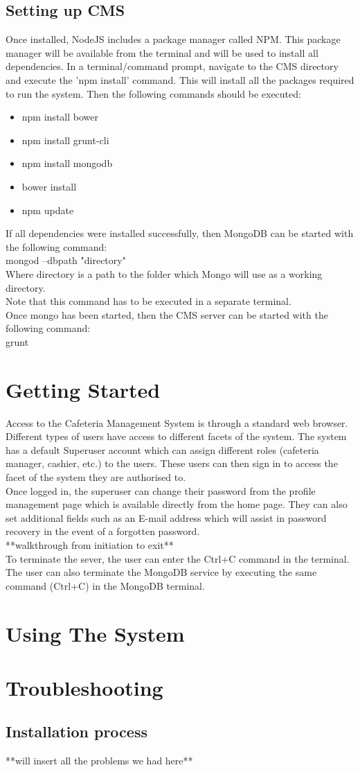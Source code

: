 \documentclass[12pt]{article}
\begin{document}
\subsection{Setting up CMS}
Once installed, NodeJS includes a package manager called NPM. This package manager will be available from the terminal and will be used to install all dependencies. In a terminal/command prompt, navigate to the CMS directory and execute the 'npm install' command. This will install all the packages required to run the system. Then the following commands should be executed:
\begin{itemize}
\item npm install bower
\item npm install grunt-cli
\item npm install mongodb
\item bower install
\item npm update
\end{itemize}

If all dependencies were installed successfully, then MongoDB can be started with the following command:\\
mongod --dbpath "directory"\\
Where directory is a path to the folder which Mongo will use as a working directory.\\
Note that this command has to be executed in a separate terminal.\\
Once mongo has been started, then the CMS server can be started with the following command:\\
grunt

\section{Getting Started}
Access to the Cafeteria Management System is through a standard web browser. Different types of users have access to different facets of the system. The system has a default Superuser account which can assign different roles (cafeteria manager, cashier, etc.) to the users. These users can then sign in to access the facet of the system they are authorised to.\\
Once logged in, the superuser can change their password from the profile management page which is available directly from the home page. They can also set additional fields such as an E-mail address which will assist in password recovery in the event of a forgotten password.\\
**walkthrough from initiation to exit**\\
To terminate the sever, the user can enter the Ctrl+C command in the terminal. The user can also terminate the MongoDB service by executing the same command (Ctrl+C) in the MongoDB terminal.

\section{Using The System} 
\section{Troubleshooting}
\subsection{Installation process}
**will insert all the problems we had here**
\end{document}
